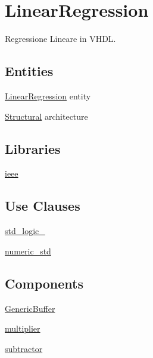 \hypertarget{group___linear_regression}{}\section{Linear\+Regression}
\label{group___linear_regression}


Regressione Lineare in V\+H\+DL.  


\subsection*{Entities}
\begin{DoxyCompactItemize}
\item 
\hyperlink{class_linear_regression}{Linear\+Regression} entity
\item 
\hyperlink{class_linear_regression_1_1_structural}{Structural} architecture
\end{DoxyCompactItemize}
\subsection*{Libraries}
 \begin{DoxyCompactItemize}
\item 
\hyperlink{group___linear_regression_ga0a6af6eef40212dbaf130d57ce711256}{ieee} 
\end{DoxyCompactItemize}
\subsection*{Use Clauses}
 \begin{DoxyCompactItemize}
\item 
\hyperlink{group___linear_regression_gacd03516902501cd1c7296a98e22c6fcb}{std\+\_\+logic\+\_}   
\item 
\hyperlink{group___linear_regression_ga2edc34402b573437d5f25fa90ba4013e}{numeric\+\_\+std}   
\end{DoxyCompactItemize}
\subsection*{Components}
 \begin{DoxyCompactItemize}
\item 
\hyperlink{group___linear_regression_ga26754353fa942392a9799290b42c41c7}{Generic\+Buffer}  {\bfseries }  
\item 
\hyperlink{group___linear_regression_ga3cf9cbfc3e637ae0660c32ceef50386f}{multiplier}  {\bfseries }  
\item 
\hyperlink{group___linear_regression_ga11e2a27abb1e6d6d48bbaae0f5de7aeb}{subtractor}  {\bfseries }  
\end{DoxyCompactItemize}
